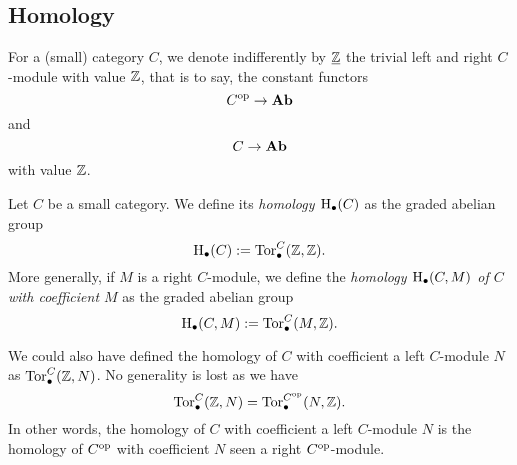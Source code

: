\subsection{Homology}
\begin{paragr}
  For a (small) category $C$, we denote indifferently by $\underline{\mathbb Z}$
  the trivial left and right $C$-module with value $\mathbb Z$, that is to
  say, the constant functors
  \[
    C^{{\mathrm{op}}} \to \mathbf{Ab}
  \]
  and
  \[
    C \to \mathbf{Ab}
  \]
  with value $\mathbb Z$.
\end{paragr}
\begin{definition}
  Let $C$ be a small category. We define its \emph{homology $\mathrm{H}_{\bullet}(C)$} as the
  graded abelian group
  \[
    \mathrm{H}_{\bullet}(C):=\mathrm{Tor}^{C}_{\bullet}(\mathbb Z,\mathbb Z).
  \]
  More generally, if $M$ is a right $C$\nbd-module, we define the
  \emph{homology $\mathrm{H}_{\bullet}(C,M)$ of $C$ with coefficient $M$} as the
  graded abelian group
  \[
    \mathrm{H}_{\bullet}(C,M):=\mathrm{Tor}^{C}_{\bullet}(M,\mathbb Z).
  \]
\end{definition}
\begin{remark}
  We could also have defined the homology of $C$ with coefficient a left
  $C$\nbd-module $N$ as $\mathrm{Tor}^{C}_{\bullet}(\mathbb Z,N)$. No generality is
  lost as we
  have \[\mathrm{Tor}^{C}_{\bullet}(\mathbb Z,N)=\mathrm{Tor}^{C^{{\mathrm{op}}}}_{\bullet}(N,\mathbb Z).\]
  In other words, the homology of $C$ with coefficient a left
  $C$\nbd-module $N$ is the homology of $C^{{\mathrm{op}}}$ with coefficient $N$
  seen a right $C^{{\mathrm{op}}}$\nbd-module.
\end{remark}